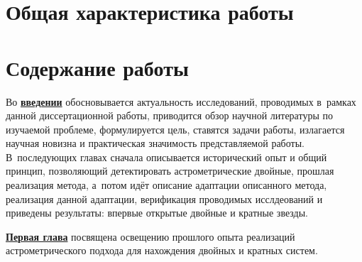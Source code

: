 
\section*{Общая характеристика работы}

\newcommand{\actuality}{\underline{\textbf{\actualityTXT}}}
\newcommand{\progress}{\underline{\textbf{\progressTXT}}}
\newcommand{\aim}{\underline{{\textbf\aimTXT}}}
\newcommand{\tasks}{\underline{\textbf{\tasksTXT}}}
\newcommand{\novelty}{\underline{\textbf{\noveltyTXT}}}
\newcommand{\influence}{\underline{\textbf{\influenceTXT}}}
\newcommand{\methods}{\underline{\textbf{\methodsTXT}}}
\newcommand{\defpositions}{\underline{\textbf{\defpositionsTXT}}}
\newcommand{\reliability}{\underline{\textbf{\reliabilityTXT}}}
\newcommand{\probation}{\underline{\textbf{\probationTXT}}}
\newcommand{\contribution}{\underline{\textbf{\contributionTXT}}}
\newcommand{\publications}{\underline{\textbf{\publicationsTXT}}}




\section*{Содержание работы}
Во \underline{\textbf{введении}} обосновывается актуальность
исследований, проводимых в~рамках данной диссертационной работы,
приводится обзор научной литературы по изучаемой проблеме,
формулируется цель, ставятся задачи работы, излагается научная новизна
и практическая значимость представляемой работы. В~последующих главах
сначала описывается исторический опыт и общий принцип, позволяющий детектировать астрометрические двойные, прошлая реализация метода, а~потом идёт описание адаптации описанного метода, реализация данной адаптации, верификация проводимых исслдеований и приведены результаты: впервые открытые двойные и кратные звезды.


\underline{\textbf{Первая глава}} посвящена освещению прошлого опыта реализаций астрометрического подхода для нахождения двойных и кратных систем. 

